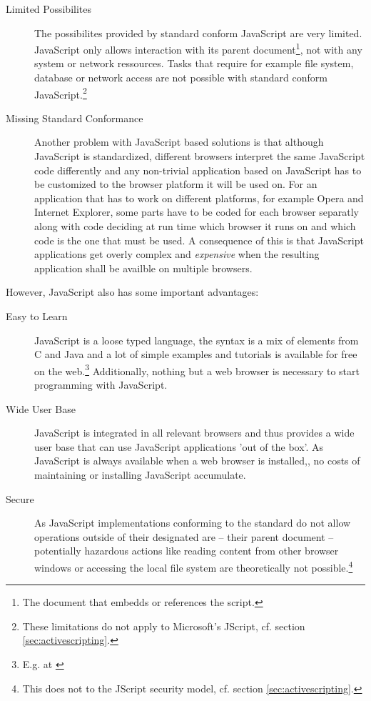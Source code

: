 \begin{description}
	\item[Limited Possibilites] The possibilites provided by standard conform JavaScript are very limited. Java\-Script only allows interaction with its parent document\footnote{The document that embedds or references the script.}, not with any system or network ressources. Tasks that require for example file system, database or network access are not possible with standard conform JavaScript.\footnote{These limitations do not apply to Microsoft's JScript, cf. section \ref{sec:activescripting}.} 
	\item[Missing Standard Conformance] Another problem with Java\-Script based solutions is that although Java\-Script is standardized, different browsers interpret the same JavaScript code differently and any non-trivial application based on JavaScript has to be customized to the browser platform it will be used on. For an application that has to work on different platforms, for example Opera and Internet Explorer, some parts have to be coded for each browser separatly along with code deciding at run time which browser it runs on and which code is the one that must be used. A consequence of this is that JavaScript applications get overly complex and \emph{expensive} when the resulting application shall be availble on multiple browsers.
\end{description}

However, JavaScript also has some important advantages:
\begin{description}
	
	\item [Easy to Learn] JavaScript is a loose typed language, the syntax is a mix of elements from C and Java and a lot of simple examples and tutorials is available for free on the web.\footnote{E.g. at \cite{W3SchJS}} Additionally, nothing but a web browser is necessary to start programming with JavaScript.
	
	\item [Wide User Base] JavaScript is integrated in all relevant browsers and thus provides a wide user base that can use JavaScript applications 'out of the box'. As JavaScript is always available when a web browser is installed,, no costs of maintaining or installing JavaScript accumulate.
	
	\item [Secure] As JavaScript implementations conforming to the standard do not allow operations outside of their designated are -- their parent document -- potentially hazardous actions like reading content from other browser windows or accessing the local file system are theoretically not possible.\footnote{This does not to the JScript security model, cf. section \ref{sec:activescripting}.}
	
\end{description}